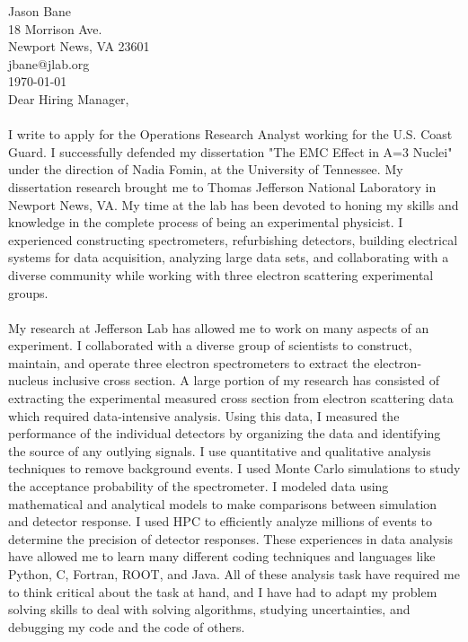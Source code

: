 \documentclass[12pt,letterpaper]{article}
\newcommand{\CPP}
{C\nolinebreak[4]\hspace{-.05em}\raisebox{.22ex}{\footnotesize\bf ++}}
\begin{document}
\vspace*{-1.2cm}
\noindent Jason Bane\\
18 Morrison Ave. \\
Newport News, VA 23601 \\
jbane@jlab.org \\
\today\\

Dear Hiring Manager,

\paragraph{}I write to apply for the Operations Research Analyst working for the U.S. Coast Guard. I successfully defended my dissertation "The EMC Effect in A=3 Nuclei" under the direction of Nadia Fomin, at the University of Tennessee. My dissertation research brought me to Thomas Jefferson National Laboratory in Newport News, VA. My time at the lab has been devoted to honing my skills and knowledge in the complete process of being an experimental physicist. I experienced constructing spectrometers, refurbishing detectors, building electrical systems for data acquisition, analyzing large data sets, and collaborating with a diverse community while working with three electron scattering experimental groups.
\paragraph{}My research at Jefferson Lab has allowed me to work on many aspects of an experiment. I collaborated with a diverse group of scientists to construct, maintain, and operate three electron spectrometers to extract the electron-nucleus inclusive cross section. A large portion of my research has consisted of extracting the experimental measured cross section from electron scattering data which required data-intensive analysis. Using this data, I measured the performance of the individual detectors by organizing the data and identifying the source of any outlying signals. I use quantitative and qualitative analysis techniques to remove background events. I used Monte Carlo simulations to study the acceptance probability of the spectrometer. I modeled data using mathematical and analytical models to make comparisons between simulation and detector response. I used HPC to efficiently analyze millions of events to determine the precision of detector responses. These experiences in data analysis have allowed me to learn many different coding techniques and languages like Python, \CPP, Fortran, ROOT, and Java. All of these analysis task have required me to think critical about the task at hand, and I have had to adapt my problem solving skills to deal with solving algorithms, studying uncertainties, and debugging my code and the code of others. 
\end{document}
